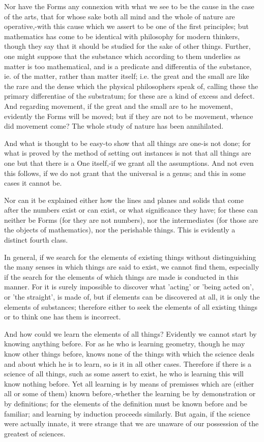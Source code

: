 \documentclass[oneside, 17pt, dvipsnames]{extbook}
\begin{document}
Nor have the Forms any connexion with what we see to be the cause in the case of the arts, that for whose sake both all mind and the whole of nature are operative,-with this cause which we assert to be one of the first principles; but mathematics has come to be identical with philosophy for modern thinkers, though they say that it should be studied for the sake of other things. Further, one might suppose that the substance which according to them underlies as matter is too mathematical, and is a predicate and differentia of the substance, ie. of the matter, rather than matter itself; i.e. the great and the small are like the rare and the dense which the physical philosophers speak of, calling these the primary differentiae of the substratum; for these are a kind of excess and defect. And regarding movement, if the great and the small are to he movement, evidently the Forms will be moved; but if they are not to be movement, whence did movement come? The whole study of nature has been annihilated.

And what is thought to be easy-to show that all things are one-is not done; for what is proved by the method of setting out instances is not that all things are one but that there is a One itself,-if we grant all the assumptions. And not even this follows, if we do not grant that the universal is a genus; and this in some cases it cannot be.

Nor can it be explained either how the lines and planes and solids that come after the numbers exist or can exist, or what significance they have; for these can neither be Forms (for they are not numbers), nor the intermediates (for those are the objects of mathematics), nor the perishable things. This is evidently a distinct fourth class.

In general, if we search for the elements of existing things without distinguishing the many senses in which things are said to exist, we cannot find them, especially if the search for the elements of which things are made is conducted in this manner. For it is surely impossible to discover what 'acting' or 'being acted on', or 'the straight', is made of, but if elements can be discovered at all, it is only the elements of substances; therefore either to seek the elements of all existing things or to think one has them is incorrect.

And how could we learn the elements of all things? Evidently we cannot start by knowing anything before. For as he who is learning geometry, though he may know other things before, knows none of the things with which the science deals and about which he is to learn, so is it in all other cases. Therefore if there is a science of all things, such as some assert to exist, he who is learning this will know nothing before. Yet all learning is by means of premisses which are (either all or some of them) known before,-whether the learning be by demonstration or by definitions; for the elements of the definition must be known before and be familiar; and learning by induction proceeds similarly. But again, if the science were actually innate, it were strange that we are unaware of our possession of the greatest of sciences.
\end{document}
